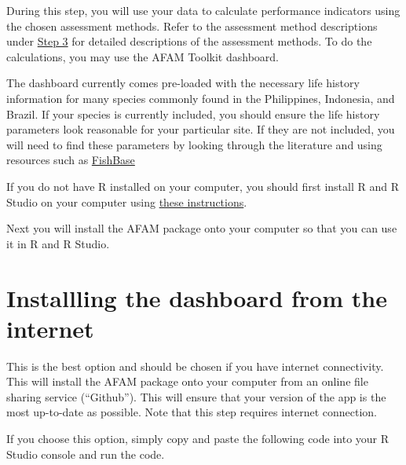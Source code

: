 \documentclass[]{book}
\begin{document}
During this step, you will use your data to calculate performance
indicators using the chosen assessment methods. Refer to the assessment
method descriptions under \protect\hyperlink{Step3}{Step 3} for detailed
descriptions of the assessment methods. To do the calculations, you may
use the AFAM Toolkit dashboard.

The dashboard currently comes pre-loaded with the necessary life history
information for many species commonly found in the Philippines,
Indonesia, and Brazil. If your species is currently included, you should
ensure the life history parameters look reasonable for your particular
site. If they are not included, you will need to find these parameters
by looking through the literature and using resources such as
\href{www.fishbase.org}{FishBase}

If you do not have R installed on your computer, you should first
install R and R Studio on your computer using
\href{https://sfg-ucsb.github.io/fishery-manageR/}{these instructions}.

Next you will install the AFAM package onto your computer so that you
can use it in R and R Studio.

\section{Installling the dashboard from the
internet}\label{installling-the-dashboard-from-the-internet}

This is the best option and should be chosen if you have internet
connectivity. This will install the AFAM package onto your computer from
an online file sharing service (``Github''). This will ensure that your
version of the app is the most up-to-date as possible. Note that this
step requires internet connection.

If you choose this option, simply copy and paste the following code into
your R Studio console and run the code.
\end{document}
